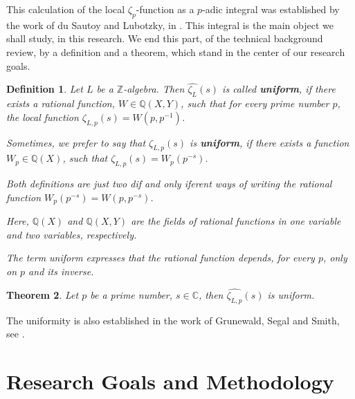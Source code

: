 \documentclass[12pt]{article}
\newtheorem{theorem}{Theorem}[subsection]
\newtheorem{definition}[theorem]{Definition}
\begin{document}
This calculation of the local $\zeta_p$-function as a $p$-adic integral was established by the work of du Sautoy and Lubotzky, in \cite{DuSautoyLubotzky}.
This integral is the main object we shall study, in this research.
We end this part, of the technical background review, by a definition and a theorem, which stand in the center of our research goals.
\begin{definition}
Let $L$ be a $\mathbb{Z}$-algebra. Then $\hat{\zeta_L}(s)$ is called \textbf{uniform}, if there exists a rational function, $W\in\mathbb{Q}(X,Y)$, such that for every prime number $p$, the local function $\zeta_{L,p}(s)=W(p,p^{-1})$.\par 
Sometimes, we prefer to say that $\zeta_{L,p}(s)$ is \textbf{uniform}, if there exists a function $W_p\in\mathbb{Q}(X)$, such that $\zeta_{L,p}(s)=W_p(p^{-s})$.\par
Both definitions are just two dif and only iferent ways of writing the rational function $W_p(p^{-s})=W(p,p^{-s})$.\par
Here, $\mathbb{Q}(X)$ and $\mathbb{Q}(X,Y)$ are the fields of rational functions in one variable and two variables, respectively.\par
The term uniform expresses that the rational function depends, for every $p$, only on $p$ and its inverse.\par
\end{definition}
\begin{theorem}
\label{thm.rational.function}
Let $p$ be a prime number, $s\in\mathbb{C}$, then $\hat{\zeta_{L,p}}(s)$ is uniform. 
\end{theorem}
The uniformity is also established in the work of Grunewald, Segal and Smith, see \cite{GrunewaldSegalSmith}.
\section{Research Goals and Methodology}
\end{document}

